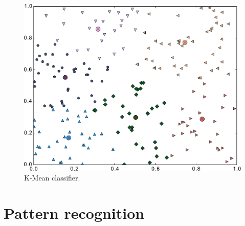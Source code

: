 \documentclass[paper=a4, fontsize=11pt]{scrartcl}
\begin{document}
\begin{figure}
\centering
\includegraphics[width=0.7\linewidth]{./figure/kmean}
\caption{K-Mean classifier.}
\label{fig:interclass_variances}
\end{figure}

\section{Pattern recognition}
\label{sec:pattern_recognition}







\end{document}
